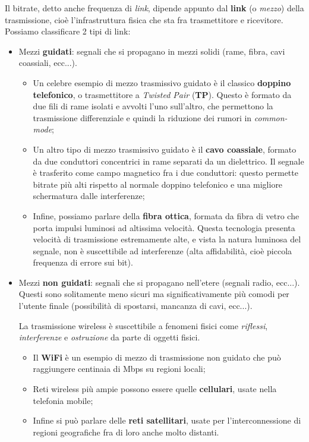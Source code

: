 \documentclass[a4paper,11pt]{article}
\begin{document}
Il bitrate, detto anche frequenza di \textit{link}, dipende appunto dal \textbf{link} (o \textit{mezzo}) della trasmissione, cioè l'infrastruttura fisica che sta fra trasmettitore e ricevitore.
Possiamo classificare 2 tipi di link:
\begin{itemize}
	\item Mezzi \textbf{guidati}: segnali che si propagano in mezzi solidi (rame, fibra, cavi coassiali, ecc...). 

		\begin{itemize}
			\item 
		Un celebre esempio di mezzo trasmissivo guidato è il classico \textbf{doppino telefonico}, o trasmettitore a \textit{Twisted Pair} (\textbf{TP}). Questo è formato da due fili di rame isolati e avvolti l'uno sull'altro, che permettono la trasmissione differenziale e quindi la riduzione dei rumori in \textit{common-mode};
			\item
		Un altro tipo di mezzo trasmissivo guidato è il \textbf{cavo coassiale}, formato da due conduttori concentrici in rame separati da un dielettrico. Il segnale è trasferito come campo magnetico fra i due conduttori: questo permette bitrate più alti rispetto al normale doppino telefonico e una migliore schermatura dalle interferenze;
			\item
		Infine, possiamo parlare della \textbf{fibra ottica}, formata da fibra di vetro che porta impulsi luminosi ad altissima velocità. Questa tecnologia presenta velocità di trasmissione estremamente alte, e vista la natura luminosa del segnale, non è suscettibile ad interferenze (alta affidabilità, cioè piccola frequenza di errore sui bit).
		\end{itemize}

	\item Mezzi \textbf{non guidati}: segnali che si propagano nell'etere (segnali radio, ecc...). Questi sono solitamente meno sicuri ma significativamente più comodi per l'utente finale (possibilità di spostarsi, mancanza di cavi, ecc...).

		La trasmissione wireless è suscettibile a fenomeni fisici come \textit{riflessi}, \textit{interferenze} e \textit{ostruzione} da parte di oggetti fisici.

		\begin{itemize}
			\item Il \textbf{WiFi} è un esempio di mezzo di trasmissione non guidato che può raggiungere centinaia di Mbps su regioni locali;
			\item Reti wireless più ampie possono essere quelle \textbf{cellulari}, usate nella telefonia mobile;
			\item Infine si può parlare delle \textbf{reti satellitari}, usate per l'interconnessione di regioni geografiche fra di loro anche molto distanti.
		\end{itemize}

\end{itemize}
\end{document}
